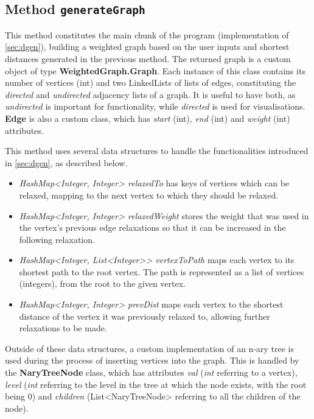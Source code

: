 \documentclass{l4proj}
\begin{document}
\subsection{Method \texttt{generateGraph}}
\label{sec:generateGraph}

This method constitutes the main chunk of the program (implementation of \autoref{sec:dgen}), building a weighted graph based on the user inputs and shortest distances generated in the previous method. The returned graph is a custom object of type \textbf{WeightedGraph.Graph}. Each instance of this class contains its number of vertices (int) and two LinkedLists of lists of edges, constituting the \emph{directed} and \emph{undirected} adjacency lists of a graph. It is useful to have both, as \emph{undirected} is important for functionality, while \emph{directed} is used for visualisations. \textbf{Edge} is also a custom class, which has \emph{start} (int), \emph{end} (int) and \emph{weight} (int) attributes.

This method uses several data structures to handle the functionalities introduced in \autoref{sec:dgen}, as described below.
\begin{itemize}
	\item
	\emph{HashMap<Integer, Integer> relaxedTo} has keys of vertices which can be relaxed, mapping to the next vertex to which they should be relaxed.
	\item
	\emph{HashMap<Integer, Integer> relaxedWeight} stores the weight that was used in the vertex's previous edge relaxations so that it can be increased in the following relaxation.
	\item
	\emph{HashMap<Integer, List<Integer>> vertexToPath} maps each vertex to its shortest path to the root vertex. The path is represented as a list of vertices (integers), from the root to the given vertex.
	\item
	\emph{HashMap<Integer, Integer> prevDist} maps each vertex to the shortest distance of the vertex it was previously relaxed to, allowing further relaxations to be made.
\end{itemize}

Outside of these data structures, a custom implementation of an n-ary tree is used during the process of inserting vertices into the graph. This is handled by the \textbf{NaryTreeNode} class, which has attributes \emph{val} (\emph{int} referring to a vertex), \emph{level} (\emph{int} referring to the level in the tree at which the node exists, with the root being $0$) and \emph{children} (List<NaryTreeNode> referring to all the children of the node). 
\end{document}
